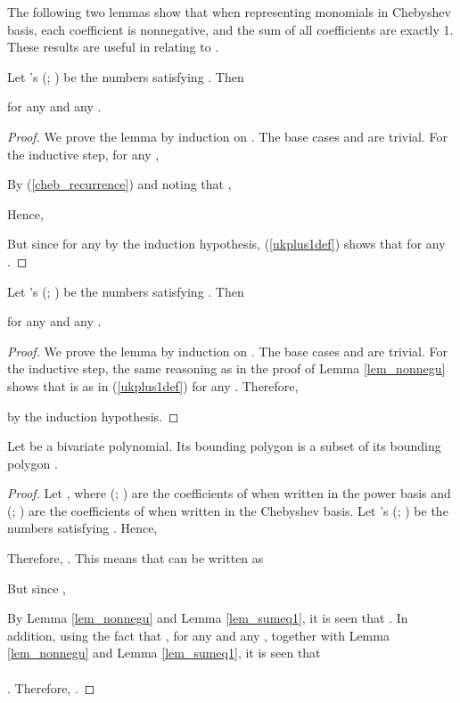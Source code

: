 \documentclass[12pt]{article}
\begin{document}
The following two lemmas show that when representing monomials
 in Chebyshev basis, each coefficient is nonnegative, and the
sum of all coefficients are exactly 1.  These results are useful
in relating  to .

\begin{lemma}
\label{lem_nonnegu} Let 's (; ) be the numbers satisfying .  Then

for any  and any .
\begin{proof}
We prove the lemma by induction on .  The base cases  and
 are trivial.  For the inductive step, for any ,

By (\ref{cheb_recurrence}) and noting that ,

Hence,

But since  for any  by the induction
hypothesis, (\ref{ukplus1def}) shows that  for
any .
\end{proof}
\end{lemma}

\begin{lemma}
\label{lem_sumeq1}
Let 's (; ) be the numbers satisfying . Then

for any  and any .
\begin{proof}
We prove the lemma by induction on .  The base cases  and
 are trivial.  For the inductive step, the same reasoning as
in the proof of Lemma \ref{lem_nonnegu} shows that  is
as in (\ref{ukplus1def}) for any .  Therefore,

by the induction hypothesis.
\end{proof}
\end{lemma}

\begin{thm}
Let  be a bivariate
polynomial. Its bounding polygon  is a subset of its
bounding polygon .
\begin{proof}
Let , where  (; ) are the
coefficients of  when written in the power basis and  (; ) are the
coefficients of  when written in the Chebyshev basis. Let
's (; ) be the numbers
satisfying .  Hence,

Therefore, .  This means that  can be written as

But since ,

By Lemma \ref{lem_nonnegu} and Lemma \ref{lem_sumeq1}, it is seen
that .  In addition, using the fact that , for any  and any , together
with Lemma \ref{lem_nonnegu} and Lemma \ref{lem_sumeq1}, it is
seen that \\ \\
.  Therefore, .
\end{proof}
\end{thm}
\end{document}
